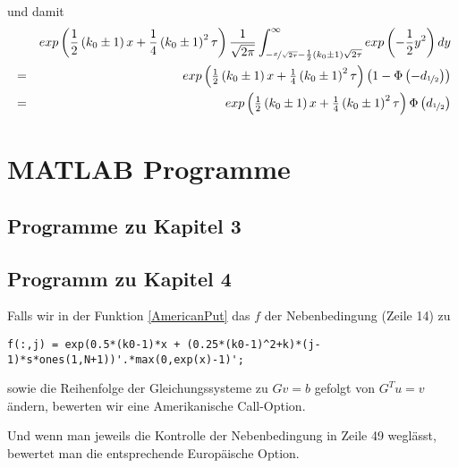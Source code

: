 und damit 
\begin{eqnarray*}
& & exp\left(\frac{1}{2}\left(k_0\pm 1\right)x + \frac{1}{4}\left(k_0 \pm 1\right)^2\tau\right)\frac{1}{\sqrt{2\pi}} \int _{-\nicefrac{x}{\sqrt{2\tau}}-\frac{1}{2}\left(k_0\pm 1\right)\sqrt{2\tau}}^{\infty} exp\left(-\frac{1}{2}y^2\right)dy \\
& = & exp\left(\tfrac{1}{2}\left(k_0 \pm 1\right)x + \tfrac{1}{4}\left(k_0 \pm 1\right)^2\tau\right)\left(1-\Phi\left(-d_{\nicefrac{1}{2}}\right)\right)\\
& = & exp\left(\tfrac{1}{2}\left(k_0 \pm 1\right)x + \tfrac{1}{4}\left(k_0 \pm 1\right)^2\tau\right)\Phi\left(d_{\nicefrac{1}{2}}\right)
\end{eqnarray*} 



\newpage%
\section{MATLAB Programme}                 %

\subsection{Programme zu Kapitel 3} %
\label{Anhang:ProgrammeKapitel3}    %






\subsection{Programm zu Kapitel 4}  %
\label{Anhang:ProgrammKapitel4}     %

Falls wir in der Funktion \ref{AmericanPut} das $f$ der Nebenbedingung (Zeile 14) zu 
\begin{lstlisting}[numbers=none]
f(:,j) = exp(0.5*(k0-1)*x + (0.25*(k0-1)^2+k)*(j-1)*s*ones(1,N+1))'.*max(0,exp(x)-1)';
\end{lstlisting}
sowie die Reihenfolge der Gleichungssysteme zu $Gv=b$ gefolgt von $G^Tu=v$ ändern, bewerten wir eine Amerikanische Call-Option.

Und wenn man jeweils die Kontrolle der Nebenbedingung in Zeile 49 weglässt, bewertet man die entsprechende Europäische Option.
